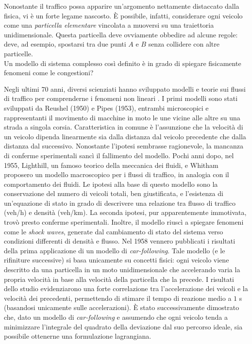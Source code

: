 \documentclass[../main.tex]{subfiles}
\begin{document}
Nonostante il traffico possa apparire un'argomento nettamente distaccato dalla fisica, vi \`e un forte legame nascosto.
\`E possibile, infatti, considerare ogni veicolo come una \emph{particella elementare} vincolata a muoversi su una traiettoria unidimensionale.
Questa particella deve ovviamente obbedire ad alcune regole: deve, ad esempio, spostarsi tra due punti $A$ e $B$ senza collidere con altre particelle.\\
Un modello di sistema complesso cos\`i definito \`e in grado di spiegare fisicamente fenomeni come le congestioni?

Negli ultimi 70 anni, diversi scienziati hanno sviluppato modelli e teorie sui flussi di traffico per comprenderne i fenomeni non lineari \cite{bs2004physics}.
I primi modelli sono stati sviluppati da Reushel (1950) e Pipes (1953), entrambi microscopici e rappresentanti il movimento di macchine in moto le une vicine alle altre su una strada a singola corsia.
Caratteristica in comune \`e l'assunzione che la velocit\`a di un veicolo dipenda linearmente sia dalla distanza dal veicolo precedente che dalla distanza dal successivo.
Nonostante l'ipotesi sembrasse ragionevole, la mancanza di conferme sperimentali sanc\`i il fallimento del modello.
Pochi anni dopo, nel 1955, Lighthill, un famoso teorico della meccanica dei fluidi, e Whitham proposero un modello macroscopico per i flussi di traffico, in analogia con il comportamento dei fluidi.
Le ipotesi alla base di questo modello sono la conservazione del numero di veicoli totali, ben giustificata, e l'esistenza di un'equazione di stato in grado di descrivere una relazione tra flusso di traffico (veh/h) e densit\`a (veh/km).
La seconda ipotesi, pur apparentemente immotivata, trov\`o presto conferme sperimentali.
Inoltre, il modello riusc\`i a spiegare fenomeni come le \emph{shock waves}, generate dal cambiamento di stato del sistema verso condizioni differenti di densit\`a e flusso.
Nel 1958 vennero pubblicati i risultati della prima applicazione di un modello di \emph{car-following}.
Tale modello (e le rifiniture successive) si basa unicamente su concetti fisici: ogni veicolo viene descritto da una particella in un moto unidimensionale che accelerando varia la propria velocit\`a in base alla velocit\`a della particella che la precede.
I risultati dello studio evidenziarono una forte correlazione tra l'accelerazione dei veicoli e la velocit\`a dei precedenti, permettendo di stimare il tempo di reazione medio a $1$ s (basandosi unicamente sulle accelerazioni).
\`E stato successivamente dimostrato che, dato un modello di \emph{car-following} e assumendo che ogni veicolo tenda a minimizzare l'integrale del quadrato della deviazione dal suo percorso ideale, sia possibile ottenerne una formulazione lagrangiana.
\end{document}

